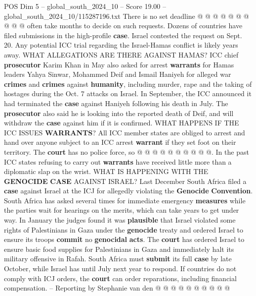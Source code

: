 \begin{textsample}{POS Dim 5 – global\_south\_2024\_10 – Score 19.00 – global\_south\_2024\_10/115287196.txt}
There is no set deadline @ @ @ @ @ @ @ @ @ @ often take months to decide on such requests.
Dozens of countries have filed submissions in the high-profile \textbf{case}.
Israel contested the request on Sept. 20.
Any potential ICC trial regarding the Israel-Hamas conflict is likely years away.
WHAT ALLEGATIONS ARE THERE AGAINST HAMAS?
ICC chief \textbf{prosecutor} Karim Khan in May also asked for arrest \textbf{warrants} for Hamas leaders Yahya Sinwar, Mohammed Deif and Ismail Haniyeh for alleged war \textbf{crimes} and \textbf{crimes} against \textbf{humanity}, including murder, rape and the taking of hostages during the Oct. 7 attacks on Israel.
In September, the ICC announced it had terminated the \textbf{case} against Haniyeh following his death in July.
The \textbf{prosecutor} also said he is looking into the reported death of Deif, and will withdraw the \textbf{case} against him if it is confirmed.
WHAT HAPPENS IF THE ICC ISSUES \textbf{WARRANTS}?
All ICC member states are obliged to arrest and hand over anyone subject to an ICC arrest \textbf{warrant} if they set foot on their territory.
The \textbf{court} has no police force, so @ @ @ @ @ @ @ @ @ @.
In the past ICC states refusing to carry out \textbf{warrants} have received little more than a diplomatic slap on the wrist.
WHAT IS HAPPENING WITH THE \textbf{GENOCIDE} \textbf{CASE} AGAINST ISRAEL?
Last December South Africa filed a \textbf{case} against Israel at the ICJ for allegedly violating the \textbf{Genocide} \textbf{Convention}.
South Africa has asked several times for immediate emergency \textbf{measures} while the parties wait for hearings on the merits, which can take years to get under way.
In January the judges found it was \textbf{plausible} that Israel violated some rights of Palestinians in Gaza under the \textbf{genocide} treaty and ordered Israel to ensure its troops \textbf{commit} no \textbf{genocidal} \textbf{acts}.
The \textbf{court} has ordered Israel to ensure basic food supplies for Palestinians in Gaza and immediately halt its military offensive in Rafah.
South Africa must \textbf{submit} its full \textbf{case} by late October, while Israel has until July next year to respond.
If countries do not comply with ICJ orders, the \textbf{court} can order reparations, including financial compensation. -- Reporting by Stephanie van den @ @ @ @ @ @ @ @ @ @

\end{textsample}
